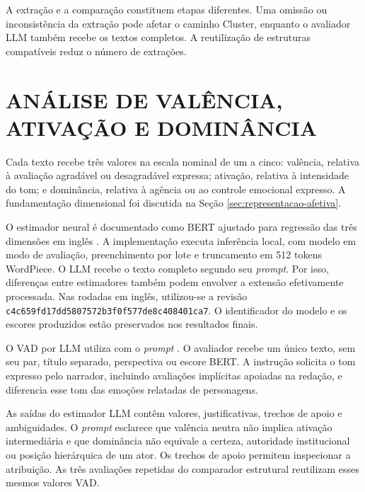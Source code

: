 A extração e a comparação constituem etapas diferentes. Uma omissão ou inconsistência da extração pode afetar o caminho Cluster, enquanto o avaliador LLM também recebe os textos completos. A reutilização de estruturas compatíveis reduz o número de extrações.

\section{ANÁLISE DE VALÊNCIA, ATIVAÇÃO E DOMINÂNCIA}
\label{sec:metodos-vad}

Cada texto recebe três valores na escala nominal de um a cinco: valência, relativa à avaliação agradável ou desagradável expressa; ativação, relativa à intensidade do tom; e dominância, relativa à agência ou ao controle emocional expresso. A fundamentação dimensional foi discutida na Seção \ref{sec:representacao-afetiva}.

O estimador neural  é documentado como BERT ajustado para regressão das três dimensões em inglês \cite{robrokoolsvadbert}. A implementação executa inferência local, com modelo em modo de avaliação, preenchimento por lote e truncamento em 512 tokens WordPiece. O LLM recebe o texto completo segundo seu \textit{prompt}. Por isso, diferenças entre estimadores também podem envolver a extensão efetivamente processada. Nas rodadas em inglês, utilizou-se a revisão \texttt{c4c659fd\allowbreak17dd5807\allowbreak572b3f0f\allowbreak577de8c4\allowbreak08401ca7}. O identificador do modelo e os escores produzidos estão preservados nos resultados finais.

O VAD por LLM utiliza  com o \textit{prompt} . O avaliador recebe um único texto, sem seu par, título separado, perspectiva ou escore BERT. A instrução solicita o tom expresso pelo narrador, incluindo avaliações implícitas apoiadas na redação, e diferencia esse tom das emoções relatadas de personagens.

As saídas do estimador LLM contêm valores, justificativas, trechos de apoio e ambiguidades. O \textit{prompt} esclarece que valência neutra não implica ativação intermediária e que dominância não equivale a certeza, autoridade institucional ou posição hierárquica de um ator. Os trechos de apoio permitem inspecionar a atribuição. As três avaliações repetidas do comparador estrutural reutilizam esses mesmos valores VAD.

